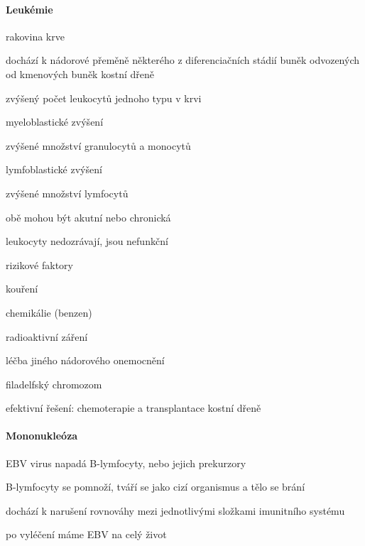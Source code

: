 \documentclass[DIV=8]{scrreprt}
\begin{document}
\paragraph{Leukémie}
\begin{myItemize}[nosep]
    \item rakovina krve
    \item dochází k nádorové přeměně některého z diferenciačních stádií buněk odvozených od kmenových buněk kostní dřeně
    \item zvýšený počet leukocytů jednoho typu v krvi
\begin{myItemize}[nosep]
    \item myeloblastické zvýšení
\begin{myItemize}[nosep]
    \item zvýšené množství granulocytů a monocytů
\end{myItemize}

    \item lymfoblastické zvýšení
\begin{myItemize}[nosep]
    \item zvýšené množství lymfocytů
\end{myItemize}

    \item obě mohou být akutní nebo chronická
\end{myItemize}

    \item leukocyty nedozrávají, jsou nefunkční
    \item rizikové faktory
\begin{myItemize}[nosep]
    \item kouření
    \item chemikálie (benzen)
    \item radioaktivní záření
    \item léčba jiného nádorového onemocnění
    \item filadelfský chromozom
\end{myItemize}

    \item efektivní řešení: chemoterapie a transplantace kostní dřeně
\end{myItemize}



\paragraph{Mononukleóza}
\begin{myItemize}[nosep]
    \item EBV virus napadá B-lymfocyty, nebo jejich prekurzory
\begin{myItemize}[nosep]
    \item B-lymfocyty se pomnoží, tváří se jako cizí organismus a tělo se brání
    \item dochází k narušení rovnováhy mezi jednotlivými složkami imunitního systému
\end{myItemize}

    \item po vyléčení máme EBV na celý život
\end{myItemize}
\end{document}
